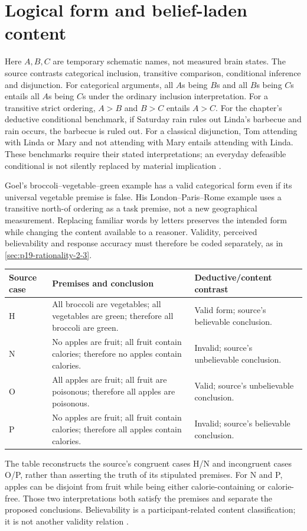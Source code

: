 \section{Logical form and belief-laden content}
\label{sec:p19-r14-logical-forms}

Here \(A,B,C\) are temporary schematic names, not measured brain states.
The source contrasts categorical inclusion, transitive comparison,
conditional inference and disjunction. For categorical arguments, all
\(A\)s being \(B\)s and all \(B\)s being \(C\)s entails all \(A\)s
being \(C\)s under the ordinary inclusion interpretation. For a transitive
strict ordering, \(A>B\) and \(B>C\) entails \(A>C\). For the chapter's
deductive conditional benchmark, if Saturday rain rules out Linda's
barbecue and rain occurs, the barbecue is ruled out. For a classical
disjunction, Tom attending with Linda or Mary and not attending with Mary
entails attending with Linda. These benchmarks require their stated
interpretations; an everyday defeasible conditional is not silently
replaced by material implication
\cite[pp.~118, 120]{Goel2021RationalityBrain}.

Goel's broccoli--vegetable--green example has a valid categorical form
even if its universal vegetable premise is false. His London--Paris--Rome
example uses a transitive north-of ordering as a task premise, not a new
geographical measurement. Replacing familiar words by letters preserves
the intended form while changing the content available to a reasoner.
Validity, perceived believability and response accuracy must therefore
be coded separately, as in \cref{sec:p19-rationality-2-3}.

\begin{center}
\begin{tabular}{@{}p{}p{}p{}@{}}
\toprule
Source case & Premises and conclusion & Deductive/content contrast\\
\midrule
H & All broccoli are vegetables; all vegetables are green;
therefore all broccoli are green. & Valid form; source's believable
conclusion.\\
N & No apples are fruit; all fruit contain calories;
therefore no apples contain calories. & Invalid; source's unbelievable
conclusion.\\
O & All apples are fruit; all fruit are poisonous;
therefore all apples are poisonous. & Valid; source's unbelievable
conclusion.\\
P & No apples are fruit; all fruit contain calories;
therefore all apples contain calories. & Invalid; source's believable
conclusion.\\
\bottomrule
\end{tabular}
\end{center}
The table reconstructs the source's congruent cases H/N and incongruent
cases O/P, rather than asserting the truth of its stipulated premises.
For N and P, apples can be disjoint from fruit while being either
calorie-containing or calorie-free. Those two interpretations both satisfy
the premises and separate the proposed conclusions. Believability is a
participant-related content classification; it is not another validity
relation \cite[pp.~120--121]{Goel2021RationalityBrain}.

